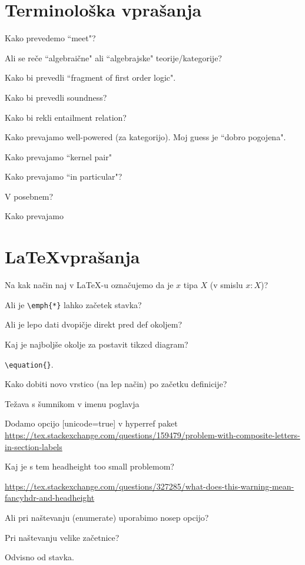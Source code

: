 \documentclass[12pt,a4paper]{article}
\newcommand\ans{\item[\textbf{A:}]}
\begin{document}
    \section*{Terminološka vprašanja}
    \begin{vprasanja}
        \item Kako prevedemo ``meet"?
        \ans
        \item Ali se reče ``algebraične" ali ``algebrajske" teorije/kategorije?
        \ans
        \item Kako bi prevedli ``fragment of first order logic".
        \ans
        \item Kako bi prevedli soundness?
        \ans
        \item Kako bi rekli entailment relation?
        \ans
        \item Kako prevajamo well-powered (za kategorijo). Moj guess je ``dobro pogojena".
        \ans
        \item Kako prevajamo ``kernel pair"
        \ans
        \item Kako prevajamo ``in particular"?
        \ans V posebnem?
        \item Kako prevajamo 
    \end{vprasanja}

    \section*{\LaTeX vprašanja}
    \begin{vprasanja}
        \item Na kak način naj v \LaTeX -u označujemo da je $x$ tipa $X$ (v smislu $x:X$)?
        \ans
        \item Ali je \verb|\emph{*}| lahko začetek stavka?
        \ans
        \item Ali je lepo dati dvopičje direkt pred def okoljem?
        \ans
        \item Kaj je najboljše okolje za postavit tikzcd diagram?
        \ans \verb|\equation{}|.
        \item Kako dobiti novo vrstico (na lep način) po začetku definicije?
        \ans 
        \item Težava s šumnikom v imenu poglavja
        \ans Dodamo opcijo [unicode=true] v hyperref paket
        \url{https://tex.stackexchange.com/questions/159479/problem-with-composite-letters-in-section-labels}
        \item Kaj je s tem headheight too small problemom?
        \ans \url{https://tex.stackexchange.com/questions/327285/what-does-this-warning-mean-fancyhdr-and-headheight}
        \item Ali pri naštevanju (enumerate) uporabimo nosep opcijo?
        \ans
        \item Pri naštevanju velike začetnice?
        \ans Odvisno od stavka.
    \end{vprasanja}
\end{document}
